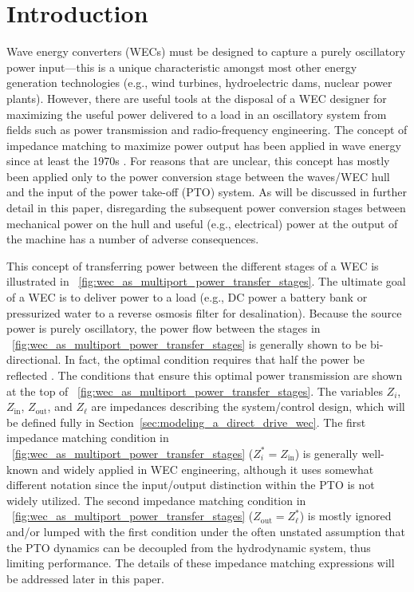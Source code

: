 \documentclass[5p,times]{elsarticle}
\begin{document}
\section{Introduction}\label{sec:introduction}
Wave energy converters (WECs) must be designed to capture a purely oscillatory power input—this is a unique characteristic amongst most other energy generation technologies (e.g., wind turbines, hydroelectric dams, nuclear power plants).
However, there are useful tools at the disposal of a WEC designer for maximizing the useful power delivered to a load in an oscillatory system from fields such as power transmission and radio-frequency engineering.
The concept of impedance matching to maximize power output has been applied in wave energy since at least the 1970s \cite{Falnes:1980aa}.
For reasons that are unclear, this concept has mostly been applied only to the power conversion stage between the waves/WEC hull and the input of the power take-off (PTO) system. 
As will be discussed in further detail in this paper, disregarding the subsequent power conversion stages between mechanical power on the hull and useful (e.g., electrical) power at the output of the machine has a number of adverse consequences.

This concept of transferring power between the different stages of a WEC is illustrated in  \figurename~\ref{fig:wec_as_multiport_power_transfer_stages}.
The ultimate goal of a WEC is to deliver power to a load (e.g., DC power a battery bank or pressurized water to a reverse osmosis filter for desalination).
Because the source power is purely oscillatory, the power flow between the stages in \figurename~\ref{fig:wec_as_multiport_power_transfer_stages} is generally shown to be bi-directional.
In fact, the optimal condition requires that half the power be reflected \cite{Evans1976}.
The conditions that ensure this optimal power transmission are shown at the top of \figurename~\ref{fig:wec_as_multiport_power_transfer_stages}.
The variables $Z_i$, $Z_{\textrm{in}}$, $Z_{\textrm{out}}$, and $Z_\ell$ are impedances describing the system/control design, which will be defined fully in Section~\ref{sec:modeling_a_direct_drive_wec}.
The first impedance matching condition in \figurename~\ref{fig:wec_as_multiport_power_transfer_stages} ($Z_i^* = Z_{\textrm{in}}$) is generally well-known and widely applied in WEC engineering, although it uses somewhat different notation since the input/output distinction within the PTO is not widely utilized. 
The second impedance matching condition in \figurename~\ref{fig:wec_as_multiport_power_transfer_stages} ($Z_{\textrm{out}} = Z_\ell^*$) is mostly ignored and/or lumped with the first condition under the often unstated assumption that the PTO dynamics can be decoupled from the hydrodynamic system, thus limiting performance.
The details of these impedance matching expressions will be addressed later in this paper.
\end{document}
